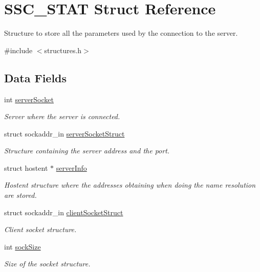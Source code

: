 \hypertarget{struct_s_s_c___s_t_a_t}{}\section{S\+S\+C\+\_\+\+S\+T\+AT Struct Reference}
\label{struct_s_s_c___s_t_a_t}


Structure to store all the parameters used by the connection to the server.  




{\ttfamily \#include $<$structures.\+h$>$}

\subsection*{Data Fields}
\begin{DoxyCompactItemize}
\item 
int \hyperlink{struct_s_s_c___s_t_a_t_a106cd1d02a334c78f546d2897a1b939c}{server\+Socket}
\begin{DoxyCompactList}\small\item\em Server where the server is connected. \end{DoxyCompactList}\item 
struct sockaddr\+\_\+in \hyperlink{struct_s_s_c___s_t_a_t_aa6596d8b411e7221fd256518fe443060}{server\+Socket\+Struct}
\begin{DoxyCompactList}\small\item\em Structure containing the server address and the port. \end{DoxyCompactList}\item 
struct hostent $\ast$ \hyperlink{struct_s_s_c___s_t_a_t_a5674e20ba1b0adaeb9cb149c93f755c2}{server\+Info}
\begin{DoxyCompactList}\small\item\em Hostent structure where the addresses obtaining when doing the name resolution are stored. \end{DoxyCompactList}\item 
struct sockaddr\+\_\+in \hyperlink{struct_s_s_c___s_t_a_t_a202412679559fc3de3606903af333031}{client\+Socket\+Struct}
\begin{DoxyCompactList}\small\item\em Client socket structure. \end{DoxyCompactList}\item 
int \hyperlink{struct_s_s_c___s_t_a_t_a67eae050a73c271691a9fb1280b4b358}{sock\+Size}
\begin{DoxyCompactList}\small\item\em Size of the socket structure. \end{DoxyCompactList}\item 

\end{DoxyCompactItemize}
